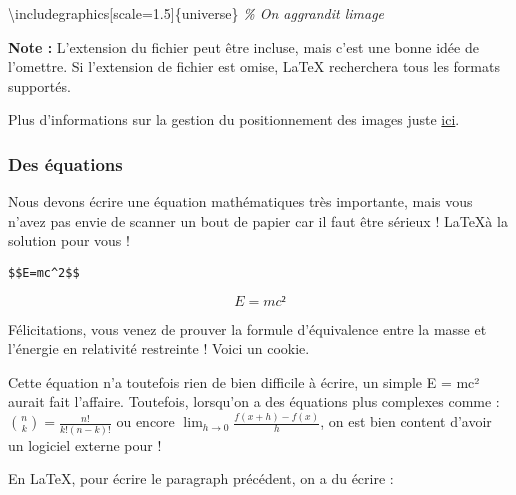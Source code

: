 \documentclass[A4paper
]{article}
\newenvironment{Shaded}{}{}
\newcommand{\BuiltInTok}[1]{#1}
\newcommand{\CommentTok}[1]{\textcolor[rgb]{0.38,0.63,0.69}{\textit{#1}}}
\newcommand{\ExtensionTok}[1]{#1}
\newcommand{\NormalTok}[1]{#1}
\newcommand{\SpecialCharTok}[1]{\textcolor[rgb]{0.25,0.44,0.63}{#1}}
\newcommand{\SpecialStringTok}[1]{\textcolor[rgb]{0.73,0.40,0.53}{#1}}
\begin{document}
\begin{Shaded}
\begin{Highlighting}[]
\BuiltInTok{\textbackslash{}includegraphics}\NormalTok{[scale=1.5]\{}\ExtensionTok{universe}\NormalTok{\} }\CommentTok{\% On aggrandit l\textquotesingle{}image}
\end{Highlighting}
\end{Shaded}

\textbf{Note :} L'extension du fichier peut être incluse, mais c'est une
bonne idée de l'omettre. Si l'extension de fichier est omise, \LaTeX
recherchera tous les formats supportés.

Plus d'informations sur la gestion du positionnement des images juste
\href{https://www.overleaf.com/learn/latex/Inserting_Images}{ici}.

\hypertarget{des-uxe9quations}{%
\subsubsection{Des équations}\label{des-uxe9quations}}

Nous devons écrire une équation mathématiques très importante, mais vous
n'avez pas envie de scanner un bout de papier car il faut être sérieux !
\LaTeX à la solution pour vous !

\begin{verbatim}
$$E=mc^2$$
\end{verbatim}

\[E=mc²\]

Félicitations, vous venez de prouver la formule d'équivalence entre la
masse et l'énergie en relativité restreinte ! Voici un cookie.

Cette équation n'a toutefois rien de bien difficile à écrire, un simple
E = mc² aurait fait l'affaire. Toutefois, lorsqu'on a des équations plus
complexes comme : \(\binom{n}{k} = \frac{n!}{k!(n-k)!}\) ou encore
\(\lim_{h \rightarrow 0 } \frac{f(x+h)-f(x)}{h}\), on est bien content
d'avoir un logiciel externe pour !

En \LaTeX, pour écrire le paragraph précédent, on a du écrire :

\begin{Shaded}
\end{Shaded}
\end{document}
